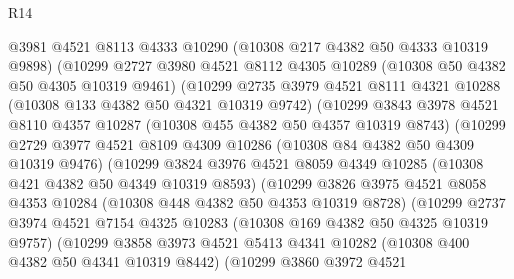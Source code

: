\begin{lexlean}{R14}
\begin{coremodule}
                @3981
                @4521
                @8113
                @4333
                @10290
                (@10308 @217 @4382 @50 @4333 @10319 @9898)
                (@10299
                  @2727
                  @3980
                  @4521
                  @8112
                  @4305
                  @10289
                  (@10308 @50 @4382 @50 @4305 @10319 @9461)
                  (@10299
                    @2735
                    @3979
                    @4521
                    @8111
                    @4321
                    @10288
                    (@10308 @133 @4382 @50 @4321 @10319 @9742)
                    (@10299
                      @3843
                      @3978
                      @4521
                      @8110
                      @4357
                      @10287
                      (@10308 @455 @4382 @50 @4357 @10319 @8743)
                      (@10299
                        @2729
                        @3977
                        @4521
                        @8109
                        @4309
                        @10286
                        (@10308 @84 @4382 @50 @4309 @10319 @9476)
                        (@10299
                          @3824
                          @3976
                          @4521
                          @8059
                          @4349
                          @10285
                          (@10308 @421 @4382 @50 @4349 @10319 @8593)
                          (@10299
                            @3826
                            @3975
                            @4521
                            @8058
                            @4353
                            @10284
                            (@10308 @448 @4382 @50 @4353 @10319 @8728)
                            (@10299
                              @2737
                              @3974
                              @4521
                              @7154
                              @4325
                              @10283
                              (@10308 @169 @4382 @50 @4325 @10319 @9757)
                              (@10299
                                @3858
                                @3973
                                @4521
                                @5413
                                @4341
                                @10282
                                (@10308 @400 @4382 @50 @4341 @10319 @8442)
                                (@10299
                                  @3860
                                  @3972
                                  @4521

\end{coremodule}
\end{lexlean}
